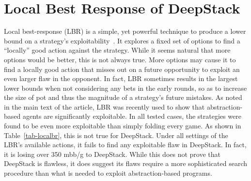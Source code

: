 \section*{Local Best Response of DeepStack}

Local best-response (LBR) is a simple, yet powerful technique to produce a lower bound on a strategy's exploitability~\cite{Lisy16:LocalBR}.  It explores a fixed set of options to find a ``locally'' good action against the strategy.  While it seems natural that more options would be better, this is not always true.  More options may cause it to find a locally good action that misses out on a future opportunity to exploit an even larger flaw in the opponent.  In fact, LBR sometimes results in the largest lower bounds when not considering any bets in the early rounds, so as to increase the size of pot and thus the magnitude of a strategy's future mistakes.  As noted in the main text of the article, LBR was recently used to show that abstraction-based agents are significantly exploitable.  In all tested cases, the strategies were found to be even more exploitable than simply folding every game.  As shown in Table~\ref{tab-localbr}, this is not true for DeepStack.  Under all settings of the LBR's available actions, it fails to find any exploitable flaw in DeepStack.  In fact, it is losing over 350 mbb/g to DeepStack.  While this does not prove that DeepStack is flawless, it does suggest its flaws require a more sophisticated search procedure than what is needed to exploit abstraction-based programs.

